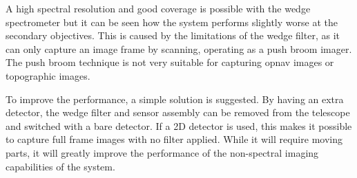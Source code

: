 A high spectral resolution and good coverage is possible with the wedge spectrometer but it can be seen how the system performs slightly worse at the secondary objectives. This is caused by the limitations of the wedge filter, as it can only capture an image frame by scanning, operating as a push broom imager. The push broom technique is not very suitable for capturing opnav images or topographic images.

To improve the performance, a simple solution is suggested. By having an extra detector, the wedge filter and sensor assembly can be removed from the telescope and switched with a bare detector. If a 2D detector is used, this makes it possible to capture full frame images with no filter applied. While it will require moving parts, it will greatly improve the performance of the non-spectral imaging capabilities of the system.

